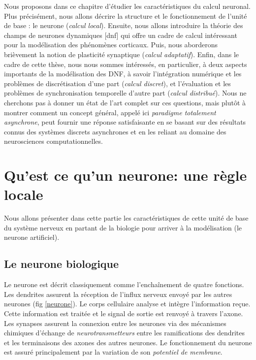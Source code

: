 Nous proposons dans ce chapitre d'étudier les caractéristiques du calcul neuronal. Plus précisément, nous allons décrire la structure et le fonctionnement de l'unité de base : le neurone ({\em calcul local}). Ensuite, nous allons introduire la théorie des champs de neurones dynamiques [\gls{dnf}] qui offre un cadre de calcul intéressant pour la modélisation des phénomènes corticaux. Puis, nous aborderons brièvement la notion de plasticité synaptique ({\em calcul adaptatif}). Enfin, dans le cadre de cette thèse, nous nous sommes intéressés, en particulier, à deux aspects importants de la modélisation des DNF, à savoir l'intégration numérique et les problèmes de discrétisation d'une part ({\em calcul discret}), et l'évaluation et les problèmes de synchronisation temporelle d'autre part ({\em calcul distribué}). Nous ne cherchons pas à donner un état de l'art complet sur ces questions, mais plutôt à montrer comment un concept général, appelé ici {\em paradigme totalement asynchrone}, peut fournir une réponse satisfaisante en se basant sur des résultats connus des systèmes discrets asynchrones et en les reliant au domaine des neurosciences computationnelles.\\

\section{Qu'est ce qu'un neurone: une règle locale}

 Nous allons présenter dans cette partie les caractéristiques de cette unité de base du système nerveux en partant de la biologie pour arriver à la modélisation (le neurone artificiel).

\subsection{Le neurone biologique}

Le neurone est décrit classiquement comme l'enchaînement de quatre fonctions. Les dendrites assurent la réception de l'influx nerveux envoyé par les autres neurones (fig \ref{neurone}). Le corps cellulaire analyse et intègre l'information reçue. Cette information est traitée et le signal de sortie est renvoyé à travers l'axone. Les synapses assurent la connexion entre les neurones via des mécanismes chimiques d'échange de \textit{neurotransmetteurs} entre les ramifications des dendrites et les terminaisons des axones des autres neurones. Le fonctionnement du neurone est assuré principalement par la variation de son \textit{potentiel de membrane}.\\ %

